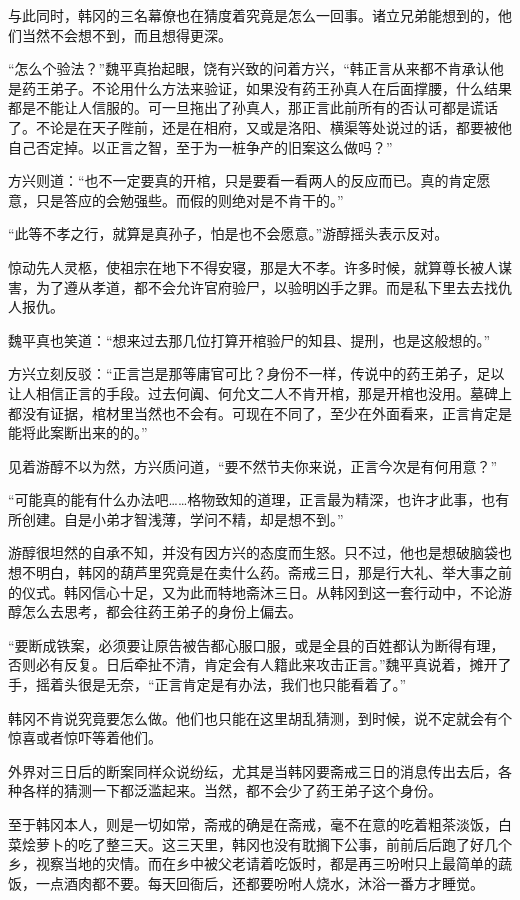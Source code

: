 与此同时，韩冈的三名幕僚也在猜度着究竟是怎么一回事。诸立兄弟能想到的，他们当然不会想不到，而且想得更深。

“怎么个验法？”魏平真抬起眼，饶有兴致的问着方兴，“韩正言从来都不肯承认他是药王弟子。不论用什么方法来验证，如果没有药王孙真人在后面撑腰，什么结果都是不能让人信服的。可一旦拖出了孙真人，那正言此前所有的否认可都是谎话了。不论是在天子陛前，还是在相府，又或是洛阳、横渠等处说过的话，都要被他自己否定掉。以正言之智，至于为一桩争产的旧案这么做吗？”

方兴则道：“也不一定要真的开棺，只是要看一看两人的反应而已。真的肯定愿意，只是答应的会勉强些。而假的则绝对是不肯干的。”

“此等不孝之行，就算是真孙子，怕是也不会愿意。”游醇摇头表示反对。

惊动先人灵柩，使祖宗在地下不得安寝，那是大不孝。许多时候，就算尊长被人谋害，为了遵从孝道，都不会允许官府验尸，以验明凶手之罪。而是私下里去去找仇人报仇。

魏平真也笑道：“想来过去那几位打算开棺验尸的知县、提刑，也是这般想的。”

方兴立刻反驳：“正言岂是那等庸官可比？身份不一样，传说中的药王弟子，足以让人相信正言的手段。过去何阗、何允文二人不肯开棺，那是开棺也没用。墓碑上都没有证据，棺材里当然也不会有。可现在不同了，至少在外面看来，正言肯定是能将此案断出来的的。”

见着游醇不以为然，方兴质问道，“要不然节夫你来说，正言今次是有何用意？”

“可能真的能有什么办法吧……格物致知的道理，正言最为精深，也许才此事，也有所创建。自是小弟才智浅薄，学问不精，却是想不到。”

游醇很坦然的自承不知，并没有因方兴的态度而生怒。只不过，他也是想破脑袋也想不明白，韩冈的葫芦里究竟是在卖什么药。斋戒三日，那是行大礼、举大事之前的仪式。韩冈信心十足，又为此而特地斋沐三日。从韩冈到这一套行动中，不论游醇怎么去思考，都会往药王弟子的身份上偏去。

“要断成铁案，必须要让原告被告都心服口服，或是全县的百姓都认为断得有理，否则必有反复。日后牵扯不清，肯定会有人籍此来攻击正言。”魏平真说着，摊开了手，摇着头很是无奈，“正言肯定是有办法，我们也只能看着了。”

韩冈不肯说究竟要怎么做。他们也只能在这里胡乱猜测，到时候，说不定就会有个惊喜或者惊吓等着他们。

外界对三日后的断案同样众说纷纭，尤其是当韩冈要斋戒三日的消息传出去后，各种各样的猜测一下都泛滥起来。当然，都不会少了药王弟子这个身份。

至于韩冈本人，则是一切如常，斋戒的确是在斋戒，毫不在意的吃着粗茶淡饭，白菜烩萝卜的吃了整三天。这三天里，韩冈也没有耽搁下公事，前前后后跑了好几个乡，视察当地的灾情。而在乡中被父老请着吃饭时，都是再三吩咐只上最简单的蔬饭，一点酒肉都不要。每天回衙后，还都要吩咐人烧水，沐浴一番方才睡觉。

